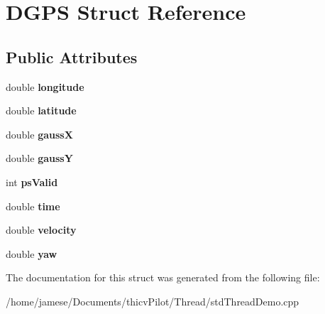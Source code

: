 \hypertarget{struct_d_g_p_s}{}\section{D\+G\+PS Struct Reference}
\label{struct_d_g_p_s}
\subsection*{Public Attributes}
\begin{DoxyCompactItemize}
\item 
\mbox{\label{struct_d_g_p_s_a7ee948a89d67105cc6f5354061e71983}} 
double {\bfseries longitude}
\item 
\mbox{\label{struct_d_g_p_s_a8b02d50160a7d59ff1f82c36693bc834}} 
double {\bfseries latitude}
\item 
\mbox{\label{struct_d_g_p_s_a341206300d95b806cc400e75bb45ae56}} 
double {\bfseries gaussX}
\item 
\mbox{\label{struct_d_g_p_s_ae29826df4eb807c4cd5e51d7169dc921}} 
double {\bfseries gaussY}
\item 
\mbox{\label{struct_d_g_p_s_ac08c04d4570e46ca7784b6d42fbc3cda}} 
int {\bfseries ps\+Valid}
\item 
\mbox{\label{struct_d_g_p_s_a604955e20c59bdc4b1ef66f9b12e497c}} 
double {\bfseries time}
\item 
\mbox{\label{struct_d_g_p_s_a7625a0d4a30b507556b5ed4d99f81eb6}} 
double {\bfseries velocity}
\item 
\mbox{\label{struct_d_g_p_s_a84357b37063095be22985a2199b18820}} 
double {\bfseries yaw}
\end{DoxyCompactItemize}


The documentation for this struct was generated from the following file\+:\begin{DoxyCompactItemize}
\item 
/home/jamese/\+Documents/thicv\+Pilot/\+Thread/std\+Thread\+Demo.\+cpp\end{DoxyCompactItemize}
